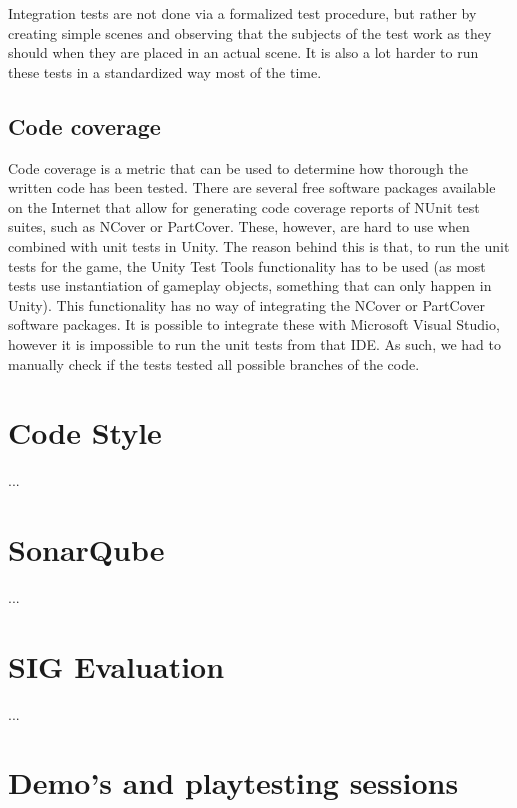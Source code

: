 	Integration tests are not done via a formalized test procedure, but rather by
	creating simple scenes and observing that the subjects of the test work
	as they should when they are placed in an actual scene. It is also a lot
	harder to run these tests in a standardized way most of the time. 
	
		\subsection{Code coverage} \label{ssec:codecoverage}
		Code coverage is a metric that can be used to determine how thorough
		the written code has been tested. There are several free software
		packages available on the Internet that allow for generating code
		coverage reports of NUnit test suites, such as NCover or PartCover.
		These, however, are hard to use when combined with unit tests in
		Unity. The reason behind this is that, to run the unit tests for
		the game, the Unity Test Tools functionality has to be used (as most
		tests use instantiation of gameplay objects, something that can
		only happen in Unity). This functionality has no way of integrating
		the NCover or PartCover software packages. It is possible to integrate
		these with Microsoft Visual Studio, however it is impossible to run
		the unit tests from that IDE. As such, we had to manually check
		if the tests tested all possible branches of the code.
		
	\section{Code Style} \label{sec:codestyle}
		...
		
	\section{SonarQube} \label{sec:sonarqube}
		...
		
	\section{SIG Evaluation} \label{sec:sigevaluation}
		...
		
	\section{Demo's and playtesting sessions} \label{sec:demos}
